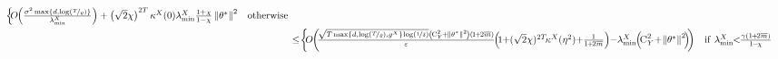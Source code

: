 \documentclass[11pt]{article}
\theoremstyle{definition}
\theoremstyle{plain}
\newcommand{\eps}{{\varepsilon}}
\newcommand{\Norm}[1]{\left\| #1 \right\|}
\providecommand{\norm}[1]{\Norm{#1}}
\renewcommand{\eps}{\varepsilon}
\begin{document}
\begin{align}
\begin{cases}
            \hspace{-0.25em}O\hspace{-0.25em}\left(\frac{\sigma^2 \max\left\{d, \log(\nicefrac{T}{\varrho})\right\}}{\lambda^{X}_{\min}}\right) + \left(\sqrt{2}\chi\right)^{2T} \kappa^{X}(0)\lambda^{X}_{\min}\frac{1+\chi}{1-\chi}\norm{\theta^{*}}^2   &\mathrm{otherwise}
        \end{cases}\\
    &\leq\hspace{-0.2em} \begin{cases}
            \hspace{-0.25em}O\hspace{-0.25em}\left(\hspace{-0.25em}\frac{\sqrt{T\max\left\{d, \log(\nicefrac{T}{\varrho}), g^{X}\right\}\hspace{-0.1em}\log(\nicefrac{1}{\delta})}\left(\hspace{-0.1em}\textsc{C}^2_Y \hspace{-0.1em}+\hspace{-0.1em} \norm{\theta^{*}}^2\hspace{-0.1em}\right)\left(\hspace{-0.1em}1 \hspace{-0.1em}+\hspace{-0.1em} 2\overline{m}\right)}{\eps}\hspace{-0.3em}\left(\hspace{-0.2em}1\hspace{-0.25em}+\hspace{-0.25em} (\sqrt{2}\chi)^{2T}\hspace{-0.15em}\kappa^{X}(\eta^2) \hspace{-0.25em}+\hspace{-0.25em}\frac{1}{1\hspace{-0.1em}+\hspace{-0.1em} 2\overline{m}}\right) \hspace{-0.25em}-\hspace{-0.25em} \lambda^{X}_{\min}\hspace{-0.25em}\left(\hspace{-0.2em}\textsc{C}^2_Y \hspace{-0.2em}+\hspace{-0.2em} \norm{\theta^{*}}^2\hspace{-0.2em}\right)\hspace{-0.25em}\right)     &\mathrm{if} \ \lambda^{X}_{\min} \hspace{-0.35em}<\hspace{-0.35em} \frac{\gamma\left(1\hspace{-0.1em}+\hspace{-0.1em}2\overline{m}\right)}{1\hspace{-0.1em}-\hspace{-0.1em}\chi} \\ 

\end{cases}
\end{align}
\end{document}
